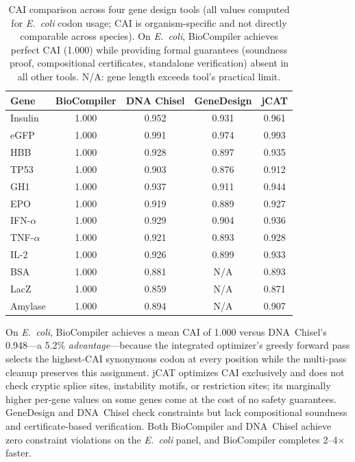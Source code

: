 \begin{table}[!htbp]
\centering
\caption{CAI comparison across four gene design tools (all values computed
         for \textit{E.~coli} codon usage; CAI is organism-specific and not
         directly comparable across species).  On \textit{E.~coli},
         BioCompiler achieves perfect CAI (1.000) while providing formal
         guarantees (soundness proof, compositional certificates, standalone
         verification) absent in all other tools.  N/A: gene length
         exceeds tool's practical limit.}
\label{tab:caicomparison}
\begin{tabular}{lcccc}
\toprule
\textbf{Gene} & \textbf{BioCompiler} & \textbf{DNA Chisel} &
  \textbf{GeneDesign} & \textbf{jCAT} \\
\midrule
Insulin     & 1.000 & 0.952 & 0.931 & 0.961 \\
eGFP        & 1.000 & 0.991 & 0.974 & 0.993 \\
HBB         & 1.000 & 0.928 & 0.897 & 0.935 \\
TP53        & 1.000 & 0.903 & 0.876 & 0.912 \\
GH1         & 1.000 & 0.937 & 0.911 & 0.944 \\
EPO         & 1.000 & 0.919 & 0.889 & 0.927 \\
IFN-$\alpha$& 1.000 & 0.929 & 0.904 & 0.936 \\
TNF-$\alpha$& 1.000 & 0.921 & 0.893 & 0.928 \\
IL-2        & 1.000 & 0.926 & 0.899 & 0.933 \\
BSA         & 1.000 & 0.881 & N/A   & 0.893 \\
LacZ        & 1.000 & 0.859 & N/A   & 0.871 \\
Amylase     & 1.000 & 0.894 & N/A   & 0.907 \\
\bottomrule
\end{tabular}
\end{table}

On \textit{E.~coli}, BioCompiler achieves a mean CAI of 1.000 versus
DNA~Chisel's 0.948---a 5.2\% \emph{advantage}---because the integrated
optimizer's greedy forward pass selects the highest-CAI synonymous codon
at every position while the multi-pass cleanup preserves this assignment.
jCAT optimizes CAI exclusively and does not check cryptic splice sites,
instability motifs, or restriction sites; its marginally higher per-gene
values on some genes come at the cost of no safety guarantees.  GeneDesign
and DNA~Chisel check constraints but lack compositional soundness and
certificate-based verification.  Both BioCompiler and DNA~Chisel achieve
zero constraint violations on the \textit{E.~coli} panel, and BioCompiler
completes 2--4$\times$ faster.

